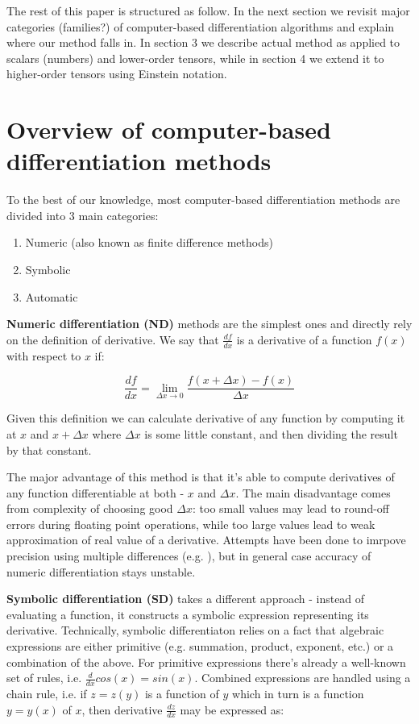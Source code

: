 \documentclass[conference]{IEEEtran}
\begin{document}
The rest of this paper is structured as follow. In the next section we revisit major categories (families?) of computer-based differentiation algorithms and explain where our method falls in. In section 3 we describe actual method as applied to scalars (numbers) and lower-order tensors, while in section 4 we extend it to higher-order tensors using  Einstein notation. 


\section{Overview of computer-based differentiation methods}

To the best of our knowledge, most computer-based differentiation methods are divided into 3 main categories: 

\begin{enumerate}
\item Numeric (also known as finite difference methods)
\item Symbolic
\item Automatic
\end{enumerate}


\textbf{Numeric differentiation (ND)} methods are the simplest ones and directly rely on the definition of derivative. We say that $\frac{df}{dx}$ is a derivative of a function $f(x)$ with respect to $x$ if: 

$$\frac{df}{dx} = \lim_{\Delta x \to 0} \frac{f(x + \Delta x) - f(x)}{\Delta x}$$

Given this definition we can calculate derivative of any function by computing it at $x$ and $x + \Delta x$ where $\Delta x$ is some little constant, and then dividing the result by that constant. 

The major advantage of this method is that it's able to compute derivatives of any function differentiable at both - $x$ and $\Delta x$. The main disadvantage comes from complexity of choosing good $\Delta x$: too small values may lead to round-off errors during floating point operations, while too large values lead to weak approximation of real value of a derivative. Attempts have been done to imrpove precision using multiple differences (e.g. \cite{fornberg1988}), but in general case accuracy of numeric differentiation stays unstable. 

\textbf{Symbolic differentiation (SD)} takes a different approach - instead of evaluating a function, it constructs a symbolic expression representing its derivative. Technically, symbolic differentiaton relies on a fact that algebraic expressions are either primitive (e.g. summation, product, exponent, etc.) or a combination of the above. For primitive expressions there's already a well-known set of rules, i.e. $\frac{d}{dx}cos(x) = sin(x)$. Combined expressions are handled using a chain rule, i.e. if $z = z(y)$ is a function of $y$ which in turn is a function $y = y(x)$ of $x$, then derivative $\frac{dz}{dx}$ may be expressed as:
\end{document}
